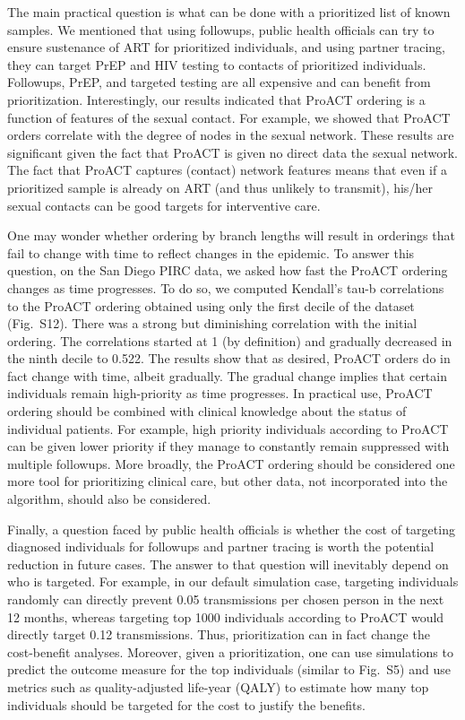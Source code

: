 \documentclass[a4paper,10pt]{article}
\newcommand{\PLWH}{sample\xspace}
\begin{document}
The main practical question  is what can be done with a prioritized list of known \PLWH{s}.
We mentioned that using followups, public health officials can try to ensure sustenance of ART for prioritized individuals, and using partner tracing, they can target PrEP and HIV testing to contacts of  prioritized individuals. Followups, PrEP, and targeted testing are all expensive and can benefit from prioritization. 
Interestingly, 
our results indicated that ProACT ordering is a function of features of the sexual contact. 
For example, we showed that ProACT orders correlate with the degree of nodes in the sexual network.
These results are significant given the fact that ProACT is given no direct data the sexual network. 
The fact that ProACT captures (contact) network features means that even if a prioritized \PLWH is already on ART (and thus unlikely to transmit), his/her sexual contacts can be good targets for interventive care. 


One may wonder whether ordering by branch lengths will result in orderings that fail to change with time to reflect changes in the epidemic.
To answer this question,
on the San Diego PIRC data, we asked how fast the  ProACT ordering changes as time progresses. To do so, we computed Kendall's tau-b correlations to the ProACT ordering obtained using only the first decile of the dataset (Fig.~S12). There was a strong but diminishing correlation with the initial ordering. The correlations started at 1 (by definition) and gradually decreased in the ninth decile to 0.522. 
The results show that as desired,  ProACT orders do in fact change with time, albeit gradually.
The gradual change implies that certain individuals remain high-priority as time progresses. 
In practical use, ProACT ordering should be combined with clinical knowledge about the status of individual patients. For example, high priority individuals according to ProACT can be given lower priority if they manage to constantly remain suppressed with multiple followups.
More broadly, the ProACT ordering should be considered one more tool for prioritizing clinical care, but other data, not incorporated into the algorithm, should also be considered. 

Finally, a question faced by public health officials is whether the cost of targeting diagnosed individuals for followups and partner tracing is worth the potential reduction in future cases. 
The answer to that question will inevitably depend on who is targeted.
For example, in our default simulation case, targeting individuals randomly can directly prevent 0.05 transmissions per chosen person  in the next 12 months, whereas targeting top 1000 individuals according to ProACT would directly target 0.12 transmissions. 
Thus, prioritization can in fact change the cost-benefit analyses. 
Moreover, given a prioritization, one can use simulations to predict the outcome measure for the top individuals (similar to Fig.~S5) and use metrics such as quality-adjusted life-year (QALY) to estimate how many top individuals should be targeted for the cost to justify the benefits.
\end{document}
